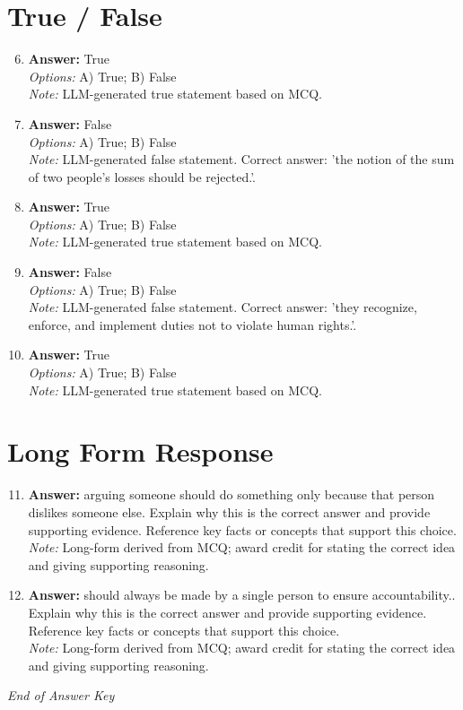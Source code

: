 \documentclass[12pt]{article}
\begin{document}
\section*{True / False}
\begin{enumerate}[label=\arabic*.]
\setcounter{enumi}{5}
\item \textbf{Answer:} True
\\ \textit{Options:} A) True; B) False
\\ \textit{Note:} LLM-generated true statement based on MCQ.
\item \textbf{Answer:} False
\\ \textit{Options:} A) True; B) False
\\ \textit{Note:} LLM-generated false statement. Correct answer: 'the notion of the sum of two people's losses should be rejected.'.
\item \textbf{Answer:} True
\\ \textit{Options:} A) True; B) False
\\ \textit{Note:} LLM-generated true statement based on MCQ.
\item \textbf{Answer:} False
\\ \textit{Options:} A) True; B) False
\\ \textit{Note:} LLM-generated false statement. Correct answer: 'they recognize, enforce, and implement duties not to violate human rights.'.
\item \textbf{Answer:} True
\\ \textit{Options:} A) True; B) False
\\ \textit{Note:} LLM-generated true statement based on MCQ.
\end{enumerate}

\section*{Long Form Response}
\begin{enumerate}[label=\arabic*.]
\setcounter{enumi}{10}
\item \textbf{Answer:} arguing someone should do something only because that person dislikes someone else. Explain why this is the correct answer and provide supporting evidence. Reference key facts or concepts that support this choice.
\\ \textit{Note:} Long-form derived from MCQ; award credit for stating the correct idea and giving supporting reasoning.
\item \textbf{Answer:} should always be made by a single person to ensure accountability.. Explain why this is the correct answer and provide supporting evidence. Reference key facts or concepts that support this choice.
\\ \textit{Note:} Long-form derived from MCQ; award credit for stating the correct idea and giving supporting reasoning.
\end{enumerate}

\vfill
\noindent\textit{End of Answer Key}
\end{document}
